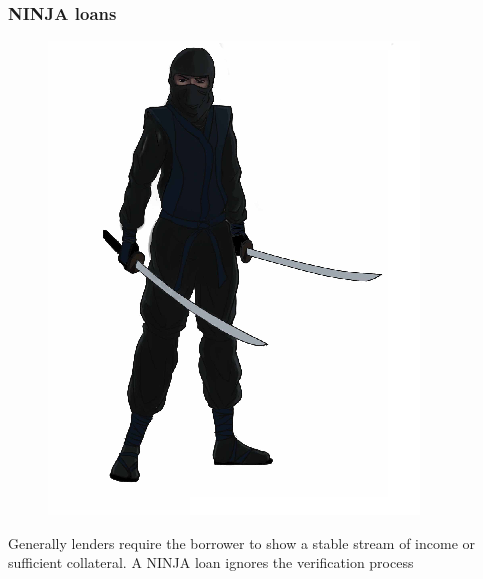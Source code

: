 \documentclass[11pt]{beamer}
\begin{document}
\begin{frame}
\frametitle{NINJA loans}
\begin{figure}
\includegraphics[width=1 \textwidth]{Figures/Ninja.png}
\end{figure}
Generally lenders require the borrower to show a stable stream of income or sufficient collateral. A NINJA loan ignores the verification process

\end{frame}
\end{document}
